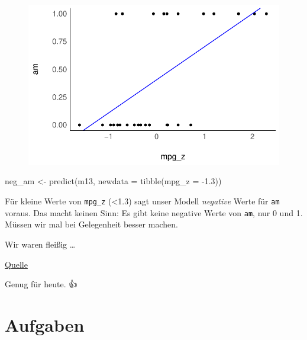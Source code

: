 \documentclass[
  a4paper,
  DIV=11]{scrreprt}
\newenvironment{Shaded}{\begin{snugshade}}{\end{snugshade}}
\newcommand{\AttributeTok}[1]{\textcolor[rgb]{0.40,0.45,0.13}{#1}}
\newcommand{\FloatTok}[1]{\textcolor[rgb]{0.68,0.00,0.00}{#1}}
\newcommand{\FunctionTok}[1]{\textcolor[rgb]{0.28,0.35,0.67}{#1}}
\newcommand{\NormalTok}[1]{\textcolor[rgb]{0.00,0.23,0.31}{#1}}
\newcommand{\OtherTok}[1]{\textcolor[rgb]{0.00,0.23,0.31}{#1}}
\newcommand{\SpecialCharTok}[1]{\textcolor[rgb]{0.37,0.37,0.37}{#1}}
\theoremstyle{definition}
\theoremstyle{remark}
\begin{document}
\begin{figure}[H]

{\centering \includegraphics{./metrische-AV_files/figure-pdf/unnamed-chunk-57-1.pdf}

}

\end{figure}

\begin{Shaded}
\begin{Highlighting}[]
\NormalTok{neg\_am }\OtherTok{\textless{}{-}} \FunctionTok{predict}\NormalTok{(m13, }\AttributeTok{newdata =} \FunctionTok{tibble}\NormalTok{(}\AttributeTok{mpg\_z =} \SpecialCharTok{{-}}\FloatTok{1.3}\NormalTok{))}
\end{Highlighting}
\end{Shaded}

Für kleine Werte von \texttt{mpg\_z} (\textless1.3) sagt unser Modell
\emph{negative} Werte für \texttt{am} voraus. Das macht keinen Sinn: Es
gibt keine negative Werte von \texttt{am}, nur 0 und 1. Müssen wir mal
bei Gelegenheit besser machen.

Wir waren fleißig \ldots{}

\href{https://giphy.com/gifs/XIqCQx02E1U9W}{Quelle}

Genug für heute. 👍

\hypertarget{aufgaben-8}{%
\section{Aufgaben}\label{aufgaben-8}}
\end{document}
